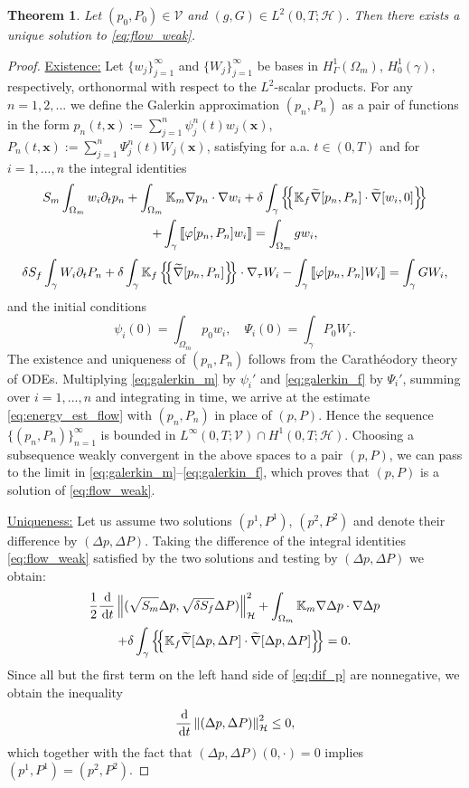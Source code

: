 \documentclass[a4paper]{article}
\newtheorem{theorem}{Theorem}
\def\agrad{\widetilde\nabla}
\def\avg#1{\left\{\mskip-5mu\left\{#1\right\}\mskip-5mu\right\}}
\def\d {\,{\rm d}}
\def\ddt#1{\frac{\d #1}{\d t}}
\def\dt{\prtl_t}
\def\Hf{\mathcal H}
\def\jmp#1{\left\llbracket #1 \right\rrbracket}
\def\norm#1{\left\|#1\right\|}
\def\pphi{{\varphi}}
\def\prtl{\partial}
\def\tn#1{{\mathbb{#1}}}    %
\def\Vf{{\mathcal V}} %
\def\vc#1{\mathbf{\boldsymbol{#1}}}     %
\def\xx{\vc x}
\newcommand{\eq}[1]{\begin{equation}#1\end{equation}}
\newcommand{\ml}[1]{\begin{multline}#1\end{multline}}
\begin{document}
\begin{theorem}
Let $(p_0,P_0)\in\Vf$ and $(g,G)\in L^2(0,T;\Hf)$.
Then there exists a unique solution to \eqref{eq:flow_weak}.
\end{theorem}
\begin{proof}
\underline{Existence:}
Let $\{w_j\}_{j=1}^\infty$ and $\{W_j\}_{j=1}^\infty$ be bases in $H^1_\Gamma(\Omega_m)$, $H^1_0(\gamma)$, respectively, orthonormal with respect to the $L^2$-scalar products.
For any $n=1,2,...$ we define the Galerkin approximation $(p_n,P_n)$ as a pair of functions in the form $p_n(t,\xx):=\sum_{j=1}^n\psi_j^n(t)w_j(\xx)$, $P_n(t,\xx):=\sum_{j=1}^n\Psi_j^n(t)W_j(\xx)$, satisfying for a.a. $t\in(0,T)$ and for $i=1,...,n$ the integral identities
\ml{ \label{eq:galerkin_m} S_m\int_{\Omega_m}w_i\dt p_n + \int_{\Omega_m}\tn K_m\nabla p_n\cdot\nabla w_i + \delta\int_\gamma\avg{\tn K_f\agrad[p_n,P_n]\cdot\agrad[w_i,0]}\\
+ \int_\gamma\jmp{\pphi[p_n,P_n]w_i} = \int_{\Omega_m}g w_i, }
\eq{ \label{eq:galerkin_f} \delta S_f\int_\gamma W_i\dt P_n + \delta\int_\gamma\tn K_f\avg{\agrad[p_n,P_n]}\cdot\nabla_\tau W_i - \int_\gamma\jmp{\pphi[p_n,P_n]W_i} = \int_\gamma G W_i, }
and the initial conditions
\[ \psi_i(0)=\int_{\Omega_m}p_0w_i, \quad \Psi_i(0)=\int_\gamma P_0W_i. \]
The existence and uniqueness of $(p_n,P_n)$ follows from the Carath\'eodory theory of ODEs.
Multiplying \eqref{eq:galerkin_m} by $\psi_i'$ and \eqref{eq:galerkin_f} by $\Psi_i'$, summing over $i=1,...,n$ and integrating in time, we arrive at the estimate \eqref{eq:energy_est_flow} with $(p_n,P_n)$ in place of $(p,P)$.
Hence the sequence $\{(p_n,P_n)\}_{n=1}^\infty$ is bounded in $L^\infty(0,T;\Vf)\cap H^1(0,T;\Hf)$.
Choosing a subsequence weakly convergent in the above spaces to a pair $(p,P)$, we can pass to the limit in \eqref{eq:galerkin_m}--\eqref{eq:galerkin_f}, which proves that $(p,P)$ is a solution of \eqref{eq:flow_weak}.

\underline{Uniqueness:}
Let us assume two solutions $(p^1,P^1)$, $(p^2,P^2)$ and denote their difference by $(\Delta p,\Delta P)$.
Taking the difference of the integral identities \eqref{eq:flow_weak} satisfied by the two solutions and testing by $(\Delta p,\Delta P)$ we obtain:
\ml{ \label{eq:dif_p} \frac12\ddt{}\norm{(\sqrt{S_m}\Delta p,\sqrt{\delta S_f}\Delta P)}_\Hf^2
+ \int_{\Omega_m}\tn K_m\nabla\Delta p\cdot\nabla\Delta p\\
+ \delta\int_\gamma\avg{\tn K_f\agrad[\Delta p,\Delta P]\cdot\agrad[\Delta p,\Delta P]} = 0. }
Since all but the first term on the left hand side of \eqref{eq:dif_p} are nonnegative, we obtain the inequality
\eq{ \ddt{}\norm{(\Delta p,\Delta P)}_\Hf^2 \le 0, }
which together with the fact that $(\Delta p,\Delta P)(0,\cdot) = 0$ implies $(p^1,P^1)=(p^2,P^2)$.
\end{proof}
\end{document}
